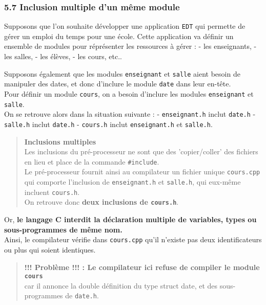 \documentclass[11pt]{article}
\begin{document}
    \subsubsection{5.7 Inclusion multiple d'un même
module}\label{inclusion-multiple-dun-muxeame-module}

Supposons que l'on souhaite développer une application \texttt{EDT} qui
permette de gérer un emploi du temps pour une école. Cette application
va définir un ensemble de modules pour réprésenter les ressources à
gérer : - les enseignants, - les salles, - les élèves, - les cours,
etc..

Supposons également que les modules \texttt{enseignant} et
\texttt{salle} aient besoin de manipuler des dates, et donc d'inclure le
module \texttt{date} dans leur en-tête.\\
Pour définir un module \texttt{cours}, on a besoin d'inclure les modules
\texttt{enseignant} et \texttt{salle}.\\
On se retrouve alors dans la situation suivante : -
\texttt{enseignant.h} inclut \texttt{date.h} - \texttt{salle.h} inclut
\texttt{date.h} - \texttt{cours.h} inclut \texttt{enseignant.h} et
\texttt{salle.h}.

\begin{quote}
\textbf{Inclusions multiples}\\
Les inclusions du pré-processeur ne sont que des 'copier/coller' des
fichiers en lieu et place de la commande \texttt{\#include}.\\
Le pré-processeur fournit ainsi au compilateur un fichier unique
\texttt{cours.cpp} qui comporte l'inclusion de \texttt{enseignant.h} et
\texttt{salle.h}, qui eux-même incluent \texttt{cours.h}.\\
On retrouve donc \textbf{deux inclusions de \texttt{cours.h}}.
\end{quote}

Or, \textbf{le langage C interdit la déclaration multiple de variables,
types ou sous-programmes de même nom.}\\
Ainsi, le compilateur vérifie dans \texttt{cours.cpp} qu'il n'existe pas
deux identificateurs ou plus qui soient identiques.

\begin{quote}
\textbf{!!! Problème !!! : Le compilateur ici refuse de compiler le
module \texttt{cours}}\\
car il annonce la double définition du type struct date, et des
sous-programmes de \texttt{date.h}.
\end{quote}
\end{document}
